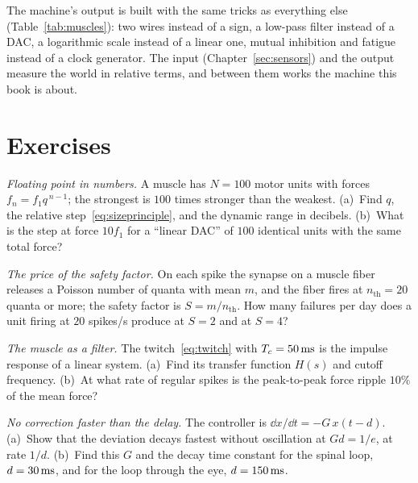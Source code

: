 The machine's output is built with the same tricks as everything else (Table~\ref{tab:muscles}): two wires instead of a sign, a low-pass filter instead of a DAC, a logarithmic scale instead of a linear one, mutual inhibition and fatigue instead of a clock generator. The input (Chapter~\ref{sec:sensors}) and the output measure the world in relative terms, and between them works the machine this book is about.

\section{Exercises}

\begin{exercise}[\lvlA]
\label{ex:13:1}
\emph{Floating point in numbers.} A muscle has $N=100$ motor units with forces $f_n=f_1q^{\,n-1}$; the strongest is $100$ times stronger than the weakest. (a)~Find $q$, the relative step~\eqref{eq:sizeprinciple}, and the dynamic range in decibels. (b)~What is the step at force $10f_1$ for a ``linear DAC'' of $100$ identical units with the same total force?
\end{exercise}

\begin{exercise}[\lvlA]
\label{ex:13:2}
\emph{The price of the safety factor.} On each spike the synapse on a muscle fiber releases a Poisson number of quanta with mean $m$, and the fiber fires at $n_{\text{th}}=20$ quanta or more; the safety factor is $S=m/n_{\text{th}}$. How many failures per day does a unit firing at $20$ spikes/s produce at $S=2$ and at $S=4$?
\end{exercise}

\begin{exercise}[\lvlB]
\label{ex:13:3}
\emph{The muscle as a filter.} The twitch~\eqref{eq:twitch} with $T_c=50\,\text{ms}$ is the impulse response of a linear system. (a)~Find its transfer function $H(s)$ and cutoff frequency. (b)~At what rate of regular spikes is the peak-to-peak force ripple $10\%$ of the mean force?
\end{exercise}

\begin{exercise}[\lvlB]
\label{ex:13:4}
\emph{No correction faster than the delay.} The controller is $\dd x/\dd t=-G\,x(t-d)$. (a)~Show that the deviation decays fastest without oscillation at $Gd=1/e$, at rate $1/d$. (b)~Find this $G$ and the decay time constant for the spinal loop, $d=30\,\text{ms}$, and for the loop through the eye, $d=150\,\text{ms}$.
\end{exercise}

